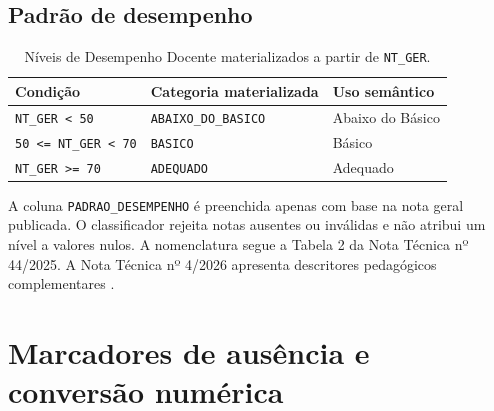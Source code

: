 \subsection{Padrão de desempenho}

\begin{table}[H]
\centering
\scriptsize
\caption{Níveis de Desempenho Docente materializados a partir de \texttt{NT\_GER}.}
\label{tab:ap-padrao-pnd}
\renewcommand{\arraystretch}{1.15}
\begin{tabular}{|p{5.0cm}|p{5.0cm}|p{4.0cm}|}
\hline
\textbf{Condição} & \textbf{Categoria materializada} & \textbf{Uso semântico} \\ \hline
\texttt{NT\_GER < 50} & \texttt{ABAIXO\_DO\_BASICO} & Abaixo do Básico \\ \hline
\texttt{50 <= NT\_GER < 70} & \texttt{BASICO} & Básico \\ \hline
\texttt{NT\_GER >= 70} & \texttt{ADEQUADO} & Adequado \\ \hline
\end{tabular}
\end{table}

A coluna \texttt{PADRAO\_DESEMPENHO} é preenchida apenas com base na nota geral publicada. O classificador rejeita notas ausentes ou inválidas e não atribui um nível a valores nulos. A nomenclatura segue a Tabela 2 da Nota Técnica nº 44/2025. A Nota Técnica nº 4/2026 apresenta descritores pedagógicos complementares \cite{inep2025notatecnica44,inep2026notatecnica4}.

\section{Marcadores de ausência e conversão numérica}

